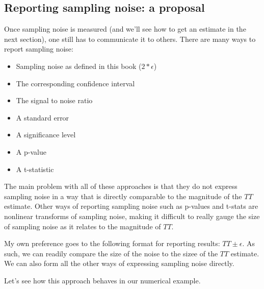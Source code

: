 \documentclass[]{book}
\providecommand{\tightlist}{%
  \setlength{\itemsep}{0pt}\setlength{\parskip}{0pt}}
\theoremstyle{definition}
\theoremstyle{definition}
\theoremstyle{definition}
\theoremstyle{remark}
\let\BeginKnitrBlock\begin \let\EndKnitrBlock\end
\begin{document}
\subsection{Reporting sampling noise: a
proposal}\label{reporting-sampling-noise-a-proposal}

Once sampling noise is measured (and we'll see how to get an estimate in
the next section), one still has to communicate it to others. There are
many ways to report sampling noise:

\begin{itemize}
\tightlist
\item
  Sampling noise as defined in this book (\(2*\epsilon\))
\item
  The corresponding confidence interval
\item
  The signal to noise ratio
\item
  A standard error
\item
  A significance level
\item
  A p-value
\item
  A t-statistic
\end{itemize}

The main problem with all of these approaches is that they do not
express sampling noise in a way that is directly comparable to the
magnitude of the \(TT\) estimate. Other ways of reporting sampling noise
such as p-values and t-stats are nonlinear transforms of sampling noise,
making it difficult to really gauge the size of sampling noise as it
relates to the magnitude of \(TT\).

My own preference goes to the following format for reporting results:
\(TT \pm \epsilon\). As such, we can readily compare the size of the
noise to the sizee of the \(TT\) estimate. We can also form all the
other ways of expressing sampling noise directly.

\BeginKnitrBlock{example}
\protect\hypertarget{exm:unnamed-chunk-37}{}{\label{exm:unnamed-chunk-37}
}Let's see how this approach behaves in our numerical example.
\EndKnitrBlock{example}
\end{document}
